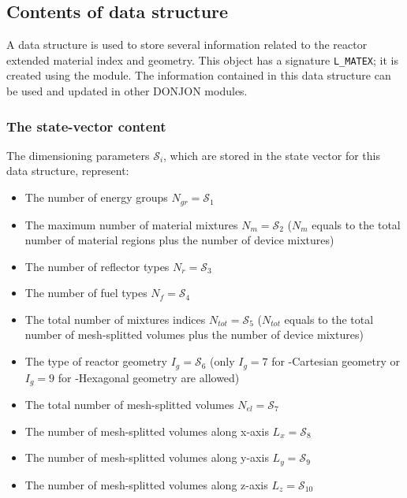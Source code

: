 \subsection{Contents of  data structure}\label{sect:matex}

\vskip 0.2cm
A  data structure is used to store several information related
to the reactor extended material index and geometry. This object has a
signature {\tt L\_MATEX}; it is created using the  module.
The information contained in this data structure can be used and updated
in other DONJON modules.

\subsubsection{The state-vector content}\label{sect:matexstate}

\noindent
The dimensioning parameters $\mathcal{S}_i$, which are stored in the state
vector for this data structure, represent:

\begin{itemize}

\item The number of energy groups $N_{gr} = \mathcal{S}_1$

\item The maximum number of material mixtures $N_m = \mathcal{S}_2$
($N_m$ equals to the total \\
number of material regions plus the number of device mixtures)

\item The number of reflector types $N_r = \mathcal{S}_3$

\item The number of fuel types $N_f = \mathcal{S}_4$

\item The total number of mixtures indices $N_{tot} = \mathcal{S}_5$
($N_{tot}$ equals to the total \\
number of mesh-splitted volumes plus the number of device mixtures)

\item The type of reactor geometry $I_g = \mathcal{S}_6$
(only $I_g=7$ for -Cartesian geometry or $I_g=9$ for
-Hexagonal geometry are allowed)

\item The total number of mesh-splitted volumes $N_{el} = \mathcal{S}_7$

\item The number of mesh-splitted volumes along x-axis $L_x = \mathcal{S}_8$

\item The number of mesh-splitted volumes along y-axis $L_y = \mathcal{S}_9$

\item The number of mesh-splitted volumes along z-axis $L_z = \mathcal{S}_{10}$

\end{itemize}

